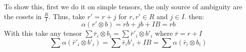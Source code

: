 \begin{description}
\begin{enumerate}[(a)]
            To show this, first we do it on simple tensors, the only source of ambiguity are the cosets in $\frac RI$. Thus, take $r'=r+j$ for $r,r' \in R$ and $j\in I$. then:
            $$ \alpha(r'\otimes b) = rb + jb + IB = rb$$
            With this take any tensor $\sum \bar r_i\otimes b_i=\sum \bar r'_i\otimes b'_i$ where $\bar r = r + I$
            $$\sum \alpha(\bar r'_i\otimes b'_i)=\sum  \bar r_i b'_i + IB = \sum\alpha(\bar r_i \otimes b_i) $$ 
            

    \end{enumerate}
\end{description}

